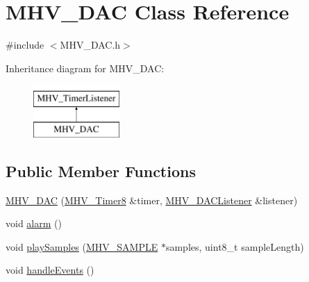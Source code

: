 \hypertarget{class_m_h_v___d_a_c}{
\section{\-M\-H\-V\-\_\-\-D\-A\-C \-Class \-Reference}
\label{class_m_h_v___d_a_c}
}


{\ttfamily \#include $<$\-M\-H\-V\-\_\-\-D\-A\-C.\-h$>$}

\-Inheritance diagram for \-M\-H\-V\-\_\-\-D\-A\-C\-:\begin{figure}[H]
\begin{center}
\leavevmode
\includegraphics[height=2.000000cm]{class_m_h_v___d_a_c}
\end{center}
\end{figure}
\subsection*{\-Public \-Member \-Functions}
\begin{DoxyCompactItemize}
\item 
\hyperlink{class_m_h_v___d_a_c_aaf9756c4abb59aeb865df41e48f66ba7}{\-M\-H\-V\-\_\-\-D\-A\-C} (\hyperlink{class_m_h_v___timer8}{\-M\-H\-V\-\_\-\-Timer8} \&timer, \hyperlink{class_m_h_v___d_a_c_listener}{\-M\-H\-V\-\_\-\-D\-A\-C\-Listener} \&listener)
\item 
void \hyperlink{class_m_h_v___d_a_c_a1973fe7e81f91152cf0ecc78328121be}{alarm} ()
\item 
void \hyperlink{class_m_h_v___d_a_c_af8820057fa7f9c33776da4f1272d79fb}{play\-Samples} (\hyperlink{_m_h_v___d_a_c_8h_a5ed12db0bcd6a3870733daecfb30e640}{\-M\-H\-V\-\_\-\-S\-A\-M\-P\-L\-E} $\ast$samples, uint8\-\_\-t sample\-Length)
\item 
void \hyperlink{class_m_h_v___d_a_c_aeebe7f40fafc2d592426e148ba87704d}{handle\-Events} ()
\end{DoxyCompactItemize}
